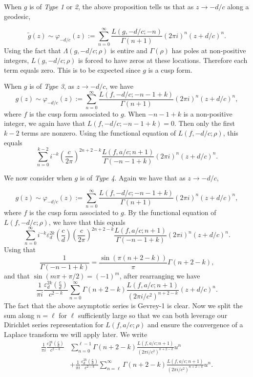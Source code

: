 \documentclass[12pt]{amsart}
\theoremstyle{definition}
\theoremstyle{plain}
\numberwithin{equation}{section}
\begin{document}
When $g$ is of \emph{Type 1} or \emph{2}, the above proposition tells us that as $z \to -d/c$ along a geodesic, 

\[\tilde{g}(z) \sim \varphi_{-d/c}(z) := \sum_{n=0}^\infty \frac{L(g, -d/c; -n)}{\Gamma(n+1)} (2\pi i)^n (z+d/c)^n.
\]
Using the fact that $\Lambda(g, -d/c; \rho)$ is entire and $\Gamma(\rho)$ has poles at non-positive integers, $L(g, -d/c; \rho)$ is forced to have zeros at these locations. Therefore each term equals zero. This is to be expected since $g$ is a cusp form. 

When $g$ is of \emph{Type 3}, as $z \to -d/c$, we have
\[g(z) \sim \varphi_{-d/c}(z) := \sum_{n=0}^\infty \frac{L(f, -d/c; -n-1+k)}{\Gamma(n+1)} (2\pi i)^n (z+d/c)^n,
\]
where $f$ is the cusp form associated to $g$. When $-n-1+k$ is a non-positive integer, we again have that $L(f, -d/c; -n-1+k)=0$. Then only the first $k-2$ terms are nonzero. Using the functional equation of $L(f, -d/c; \rho)$, this equals
\[\sum_{n=0}^{k-2} i^{-k} \left(\frac{c}{2\pi}\right)^{2n+2-k} \frac{L(f, a/c; n+1)}{\Gamma(-n-1+k)} (2\pi i)^n (z+d/c)^n. 
\]


 
We now consider when $g$ is of \emph{Type 4}. Again we have that as $z \to -d/c$, 

\[g(z) \sim \varphi_{-d/c}(z) := \sum_{n=0}^\infty \frac{L(f, -d/c; -n-1+k)}{\Gamma(n+1)} (2\pi i)^n (z+d/c)^n,
\]
where $f$ is the cusp form associated to $g$. By the functional equation of $L(f, -d/c;\rho)$, we have that this equals
\[\sum_{n=0}^\infty i^{-k} \varepsilon_d^{2k} \left( \frac{c}{d}\right) \left(\frac{c}{2\pi}\right)^{2n+2-k} \frac{L(f, a/c; n+1)}{\Gamma(-n-1+k)} (2\pi i)^n (z+d/c)^n.
\]
 Using that 
\[\frac{1}{\Gamma(-n-1+k)} = \frac{\sin(\pi(n+2-k))}{\pi} \Gamma(n+2-k),
\]
and that $\sin(m\pi + \pi/2)= (-1)^m$, after rearranging we have
\[\frac{1}{\pi i}  \frac{\varepsilon_d^{2k} \left( \frac{c}{d}\right) }{c^{2-k}}\sum_{n=0}^\infty \Gamma(n+2-k) \frac{L(f, a/c; n+1)}{(2\pi i /c^2)^{n+2-k}} (z+d/c)^n. 
\]
The fact that the above asymptotic series is Gevrey-1 is clear. 
Now we split the sum along $n=\ell$ for $\ell$ sufficiently large so that we can both leverage our Dirichlet series representation for $L(f, a/c; \rho)$ and ensure the convergence of a Laplace transform we will apply later. We write
\begin{align*}\frac{1}{\pi i}  \frac{\varepsilon_d^{2k} \left( \frac{c}{d}\right) }{c^{2-k}} &\sum_{n=0}^{\ell-1}\Gamma(n+2-k) \frac{L(f, a/c; n+1)}{(2\pi i /c^2)^{n+2-k}} u^n \\&+ \frac{1}{\pi i} \frac{\varepsilon_d^{2k} \left( \frac{c}{d}\right)}{c^{2-k}}\sum_{n=\ell}^{\infty} \Gamma(n+2-k)\frac{L(f, a/c; n+1)}{(2\pi i /c^2)^{n+2-k}} u^n.
\end{align*}
\end{document}
